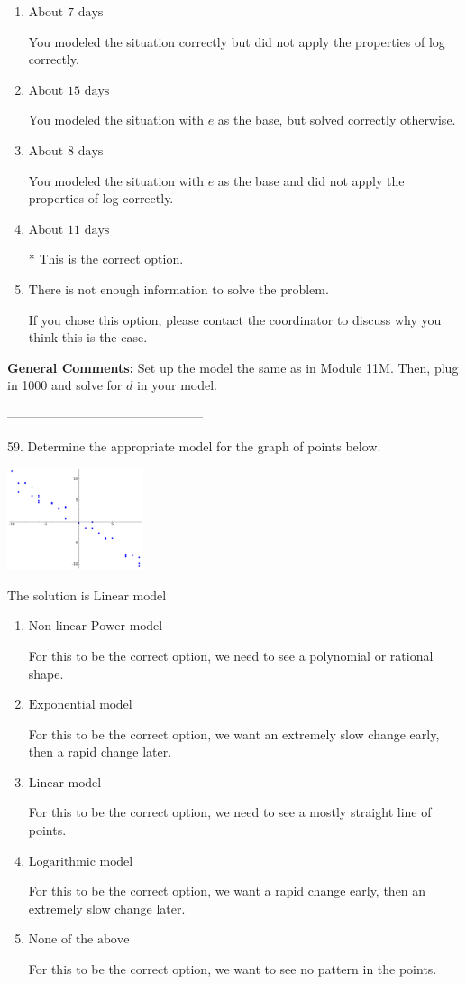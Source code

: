 \documentclass{extbook}[14pt]
\begin{document}
\begin{enumerate}[label=\Alph*.] 
\item $ \text{About } 7 \text{ days} $ 

 You modeled the situation correctly but did not apply the properties of log correctly. 
\item $ \text{About } 15 \text{ days} $ 

 You modeled the situation with $e$ as the base, but solved correctly otherwise. 
\item $ \text{About } 8 \text{ days} $ 

 You modeled the situation with $e$ as the base and did not apply the properties of log correctly. 
\item $ \text{About } 11 \text{ days} $ 

 * This is the correct option. 
\item $ \text{There is not enough information to solve the problem.} $ 

 If you chose this option, please contact the coordinator to discuss why you think this is the case. 
\end{enumerate} 
 
\textbf{General Comments:} Set up the model the same as in Module 11M. Then, plug in 1000 and solve for $d$ in your model.

-----------------------------------------------

59. Determine the appropriate model for the graph of points below.
\begin{center} \includegraphics[width=0.3\textwidth]{../Figures/identifyModelGraph12A.png} \end{center} 

The solution is $ \text{Linear model} $ 

\begin{enumerate}[label=\Alph*.] 
\item $ \text{Non-linear Power model} $ 

 For this to be the correct option, we need to see a polynomial or rational shape. 
\item $ \text{Exponential model} $ 

 For this to be the correct option, we want an extremely slow change early, then a rapid change later. 
\item $ \text{Linear model} $ 

 For this to be the correct option, we need to see a mostly straight line of points. 
\item $ \text{Logarithmic model} $ 

 For this to be the correct option, we want a rapid change early, then an extremely slow change later. 
\item $ \text{None of the above} $ 

 For this to be the correct option, we want to see no pattern in the points. 
\end{enumerate} 
 
\end{document}
